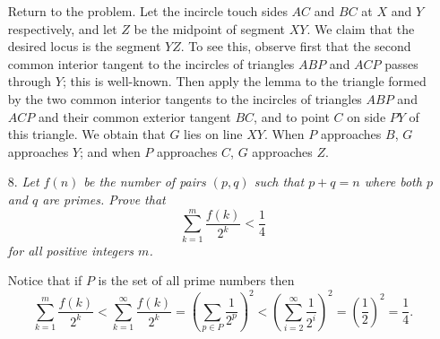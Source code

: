 \documentclass{article}
\begin{document}
\begin{enumerate}
Return to the problem. Let the incircle touch sides $AC$ and $BC$ at $X$ and $Y$ respectively, and let $Z$ be the midpoint of segment $XY$.
We claim that the desired locus is the segment $YZ$. To see this, observe first that the second common interior tangent to the incircles of triangles $ABP$ and $ACP$ passes through $Y$; this is well-known.
Then apply the lemma to the triangle formed by the two common interior tangents to the incircles of triangles $ABP$ and $ACP$ and their common
exterior tangent $BC$, and to point $C$ on side $PY$ of this triangle. 
We obtain that $G$ lies on line $XY$. When $P$ approaches $B$, $G$ approaches $Y$; and when $P$ approaches $C$, $G$ approaches $Z$.

\medskip
\item[8.] %
\textit{Let $f(n)$ be the number of pairs $(p, q)$ such that $p + q = n$ where both $p$ and $q$ are primes. Prove that
$$\sum_{k = 1}^{m} \frac{f(k)}{2^k} < \frac{1}{4}$$
for all positive integers $m$.}

Notice that if $P$ is the set of all prime numbers then
$$\sum_{k = 1}^{m} \frac{f(k)}{2^k} < \sum_{k = 1}^{\infty} \frac{f(k)}{2^k} = (\sum_{p \in P} \frac{1}{2^p})^2 < (\sum_{i = 2}^{\infty} \frac{1}{2^i})^2 = (\frac{1}{2})^2 = \frac{1}{4}.$$

\end{enumerate}
\end{document}
